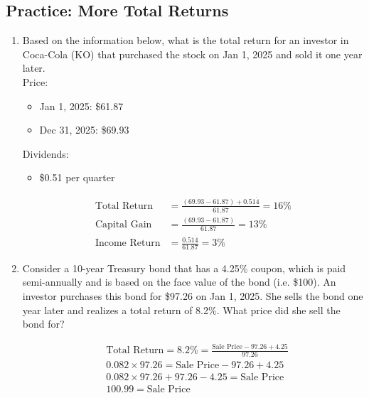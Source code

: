 \documentclass[11pt]{article}
\theoremstyle{definition}
\begin{document}
    \begin{shaded}
        \subsection{Practice: More Total Returns}
        \begin{enumerate}
        \item Based on the information below, what is the total return for an investor in Coca-Cola (KO) that purchased the stock on Jan 1, 2025 and sold it one year later.\\
        Price:
            \begin{itemize}
                \item Jan 1, 2025:  \$61.87
                \item Dec 31, 2025: \$69.93
            \end{itemize}
    	Dividends: 
            \begin{itemize}
                \item \$0.51 per quarter 
            \end{itemize}

            \begin{align*}
            \text{Total Return} &= \frac{(69.93-61.87) + 0.51\dot4}{61.87} = 16\%\\
            \text{Capital Gain} &= \frac{(69.93-61.87)}{61.87} = 13\%\\
            \text{Income Return} &= \frac{0.51\dot4}{61.87} = 3\%
            \end{align*}
    
        \item Consider a 10-year Treasury bond that has a 4.25\% coupon, which is paid semi-annually and is based on the face value of the bond (i.e. \$100).   An investor purchases this bond for \$97.26 on Jan 1, 2025.   She sells the bond one year later and realizes a total return of 8.2\%.   What price did she sell the bond for?

        \begin{align*}
            &\text{Total Return} = 8.2\% = \frac{\text{Sale Price} - 97.26 + 4.25}{97.26} \\
            &0.082 \times 97.26 = \text{Sale Price} - 97.26 + 4.25 \\
            &0.082 \times 97.26 + 97.26 - 4.25 = \text{Sale Price} \\
            &100.99 = \text{Sale Price}
        \end{align*}
        
        \end{enumerate}
    \end{shaded}
\end{document}
